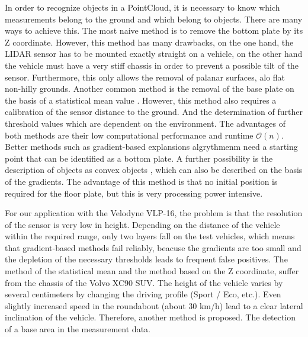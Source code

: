 \documentclass[11pt,oneside,openright]{mpreport}
\begin{document}
In order to recognize objects in a PointCloud, it is necessary to know which measurements belong to the ground and which belong to objects.
There are many ways to achieve this. The most naive method is to remove the bottom plate by its Z coordinate.
However, this method has many drawbacks, on the one hand, the LIDAR sensor has to be mounted exactly straight on a vehicle, 
on the other hand the vehicle must have a very stiff chassis in order to prevent a possible tilt of the sensor. 
Furthermore, this only allows the removal of palanar surfaces, alo flat non-hilly grounds. 
Another common method is the removal of the base plate on the basis of a statistical mean value \cite{Zhang}.
However, this method also requires a calibration of the sensor distance to the ground. 
And the determination of further threshold values which are dependent on the environment.
The advantages of both methods are their low computational performance and runtime $\mathcal{O}(n)$.
Better methods such as gradient-based explansions algrythmenm need a starting point that can be identified as a bottom plate.
A further possibility is the description of objects as convex objects \cite{5164280}, which can also be described on the basis of the gradients.
The advantage of this method is that no initial position is required for the floor plate, but this is very processing power intensive.
% 

For our application with the Velodyne VLP-16, the problem is that the resolution of the sensor is very low in height.
Depending on the distance of the vehicle within the required range, only two layers fall on the test vehicles, which means that gradient-based methods fail reliably,
 beacuse the gradients are too small and the depletion of the necessary thresholds leads to frequent false positives. 
The method of the statistical mean and the method based on the Z coordinate, suffer from the chassis of the Volvo XC90 SUV. 
The height of the vehicle varies by several centimeters by changing the driving profile (Sport / Eco, etc.). Even slightly increased speed in the roundabout (about 30 km/h)
lead to a clear lateral inclination of the vehicle. Therefore, another method is proposed. The detection of a base area in the measurement data.
\end{document}
